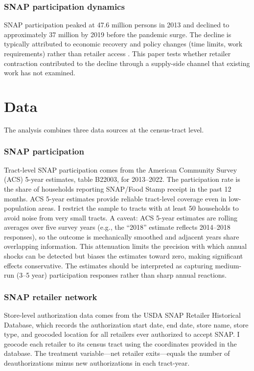 \documentclass[12pt]{article}
\begin{document}
\subsubsection*{SNAP participation dynamics} SNAP participation peaked at 47.6 million persons in 2013 and declined to approximately 37 million by 2019 before the pandemic surge. The decline is typically attributed to economic recovery and policy changes (time limits, work requirements) rather than retailer access \citep{ganong2018}. This paper tests whether retailer contraction contributed to the decline through a supply-side channel that existing work has not examined.


\section{Data}
\label{sec:data}

The analysis combines three data sources at the census-tract level.

\subsubsection*{SNAP participation} Tract-level SNAP participation comes from the American Community Survey (ACS) 5-year estimates, table B22003, for 2013--2022. The participation rate is the share of households reporting SNAP/Food Stamp receipt in the past 12 months. ACS 5-year estimates provide reliable tract-level coverage even in low-population areas. I restrict the sample to tracts with at least 50 households to avoid noise from very small tracts. A caveat: ACS 5-year estimates are rolling averages over five survey years (e.g., the ``2018'' estimate reflects 2014--2018 responses), so the outcome is mechanically smoothed and adjacent years share overlapping information. This attenuation limits the precision with which annual shocks can be detected but biases the estimates toward zero, making significant effects conservative. The estimates should be interpreted as capturing medium-run (3--5 year) participation responses rather than sharp annual reactions.

\subsubsection*{SNAP retailer network} Store-level authorization data comes from the USDA SNAP Retailer Historical Database, which records the authorization start date, end date, store name, store type, and geocoded location for all retailers ever authorized to accept SNAP. I geocode each retailer to its census tract using the coordinates provided in the database. The treatment variable---net retailer exits---equals the number of deauthorizations minus new authorizations in each tract-year.
\end{document}
